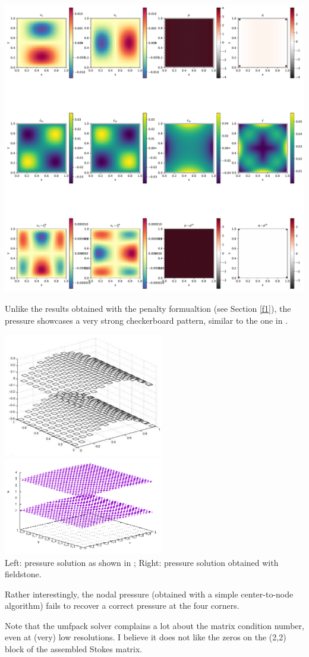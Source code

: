 \includegraphics[width=16cm]{python_codes/fieldstone_14/solution.pdf}

Unlike the results obtained with the penalty formualtion (see Section \ref{f1}),
the pressure showcases a very strong checkerboard pattern, similar to the one 
in \cite{dohu05}.

\begin{center}
\includegraphics[width=7cm]{python_codes/fieldstone_14/doneahuerta}
\includegraphics[width=7cm]{python_codes/fieldstone_14/mine}\\
Left: pressure solution as shown in \cite{dohu05}; Right: pressure solution obtained
with fieldstone.
\end{center}

Rather interestingly, the nodal pressure (obtained with a simple center-to-node algorithm)
fails to recover a correct pressure at the four corners.

Note that the umfpack solver complains a lot about the matrix condition number, 
even at (very) low resolutions. I believe it does not like the zeros on the (2,2)
block of the assembled Stokes matrix. 
